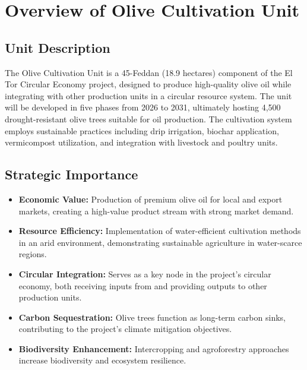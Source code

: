 \section{Overview of Olive Cultivation Unit}

\subsection{Unit Description}
The Olive Cultivation Unit is a 45-Feddan (18.9 hectares) component of the El Tor Circular Economy project, designed to produce high-quality olive oil while integrating with other production units in a circular resource system. The unit will be developed in five phases from 2026 to 2031, ultimately hosting 4,500 drought-resistant olive trees suitable for oil production. The cultivation system employs sustainable practices including drip irrigation, biochar application, vermicompost utilization, and integration with livestock and poultry units.

\subsection{Strategic Importance}
\begin{itemize}
    \item \textbf{Economic Value:} Production of premium olive oil for local and export markets, creating a high-value product stream with strong market demand.
    
    \item \textbf{Resource Efficiency:} Implementation of water-efficient cultivation methods in an arid environment, demonstrating sustainable agriculture in water-scarce regions.
    
    \item \textbf{Circular Integration:} Serves as a key node in the project's circular economy, both receiving inputs from and providing outputs to other production units.
    
    \item \textbf{Carbon Sequestration:} Olive trees function as long-term carbon sinks, contributing to the project's climate mitigation objectives.
    
    \item \textbf{Biodiversity Enhancement:} Intercropping and agroforestry approaches increase biodiversity and ecosystem resilience.
\end{itemize}

